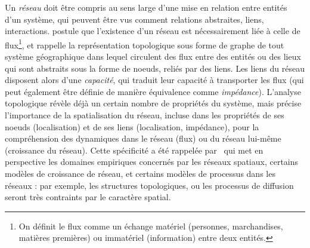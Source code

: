 Un \emph{réseau} doit être compris au sens large d'une mise en relation entre entités d'un système, qui peuvent être vus comment relations abstraites, liens, interactions. \cite{haggett1970network} postule que l'existence d'un réseau est nécessairement liée à celle de flux\footnote{On définit le flux comme un échange matériel (personnes, marchandises, matières premières) ou immatériel (information) entre deux entités.}, et rappelle la représentation topologique sous forme de graphe de tout système géographique dans lequel circulent des flux entre des entités ou des lieux qui sont abstraits sous la forme de noeuds, reliés par des liens. Les liens du réseau disposent alors d'une \emph{capacité}, qui traduit leur capacité à transporter les flux (qui peut également être définie de manière équivalence comme \emph{impédance}). L'analyse topologique révèle déjà un certain nombre de propriétés du système, mais \cite{haggett1970network} précise l'importance de la spatialisation du réseau, incluse dans les propriétés de ses noeuds (localisation) et de ses liens (localisation, impédance), pour la compréhension des dynamiques dans le réseau (flux) ou du réseau lui-même (croissance du réseau). Cette spécificité a été rappelée par~\cite{barthelemy2011spatial} qui met en perspective les domaines empiriques concernés par les réseaux spatiaux, certains modèles de croissance de réseau, et certains modèles de processus dans les réseaux : par exemple, les structures topologiques, ou les processus de diffusion seront très contraints par le caractère spatial.




